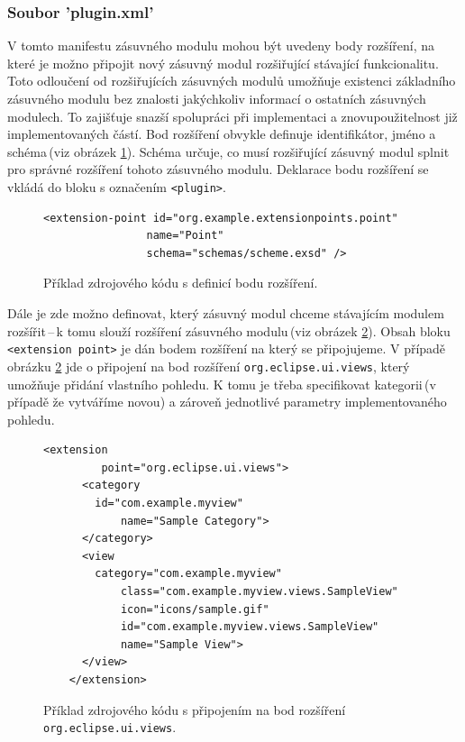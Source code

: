      \subsubsection{Soubor 'plugin.xml'}
      V tomto manifestu zásuvného modulu mohou být uvedeny body rozšíření, na které je možno připojit nový zásuvný modul rozšiřující stávající funkcionalitu. Toto odloučení od rozšiřujících zásuvných modulů umožňuje existenci základního zásuvného modulu bez znalosti jakýchkoliv informací o ostatních zásuvných modulech. To zajišťuje snazší spolupráci při implementaci a znovupoužitelnost již implementovaných částí. Bod rozšíření obvykle definuje identifikátor, jméno a schéma\,(viz obrázek \ref{code:extension_point_declaration}). Schéma určuje, co musí rozšiřující zásuvný modul splnit pro správné rozšíření tohoto zásuvného modulu. Deklarace bodu rozšíření se vkládá do bloku s označením \texttt{<plugin>}. 
      
      \lstset{language=xml}
      \begin{figure}[h]
	\begin{lstlisting}[frame=single]
	  <extension-point id="org.example.extensionpoints.point"
                name="Point"
                schema="schemas/scheme.exsd" />
	\end{lstlisting}
	\caption{Příklad zdrojového kódu s definicí bodu rozšíření.}
	\label{code:extension_point_declaration}
      \end{figure}
      
      Dále je zde možno definovat, který zásuvný modul chceme stávajícím modulem rozšířit\,--\,k tomu slouží rozšíření zásuvného modulu\,(viz obrázek \ref{code:extension_declaration}). Obsah bloku \texttt{<extension point>} je dán bodem rozšíření na který se připojujeme. V případě obrázku \ref{code:extension_declaration} jde o připojení na bod rozšíření \texttt{org.eclipse.ui.views}, který umožňuje přidání vlastního pohledu. K tomu je třeba specifikovat kategorii\,(v případě že vytváříme novou) a zároveň jednotlivé parametry implementovaného pohledu.
      
      \begin{figure}[h]
	\begin{lstlisting}[frame=single]
	  <extension
         point="org.eclipse.ui.views">
	  <category
	    id="com.example.myview"
            name="Sample Category">
	  </category>
	  <view
	    category="com.example.myview"
            class="com.example.myview.views.SampleView"
            icon="icons/sample.gif"
            id="com.example.myview.views.SampleView"
            name="Sample View">
	  </view>
	</extension>
	\end{lstlisting}
	\caption{Příklad zdrojového kódu s připojením na bod rozšíření \texttt{org.eclipse.ui.views}.}
	\label{code:extension_declaration}
      \end{figure}